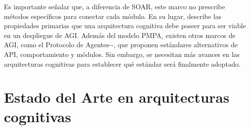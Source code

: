 Es importante señalar que, a diferencia de SOAR, este marco no prescribe métodos
específicos para conectar cada módulo. En su lugar, describe las propiedades
primarias que una arquitectura cognitiva debe poseer para ser viable en un
despliegue de AGI. Además del modelo PMPA, existen otros marcos de AGI, como el
Protocolo de Agentes-\citet{engineerfoundation2023ap}-, que proponen estándares
alternativos de API, comportamiento y módulos. Sin embargo, se necesitan más
avances en las arquitecturas cognitivas para establecer qué estándar será
finalmente adoptado.

\section {Estado del Arte en arquitecturas cognitivas}
